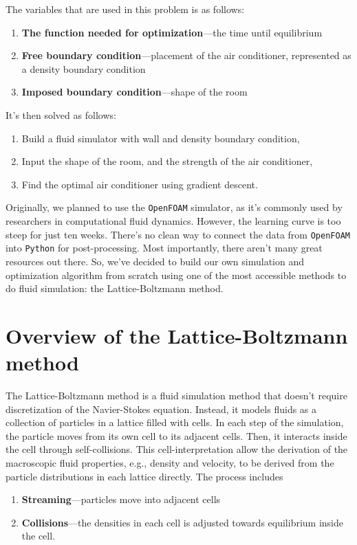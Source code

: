 The variables that are used in this problem is as follows:
\begin{enumerate}[noitemsep]
	\item \textbf{The function needed for optimization}---the time until equilibrium
	\item \textbf{Free boundary condition}---placement of the air conditioner, represented as a density boundary condition
	\item \textbf{Imposed boundary condition}---shape of the room
\end{enumerate}
It's then solved as follows:
\begin{enumerate}[noitemsep]
	\item Build a fluid simulator with wall and density boundary condition,
	\item Input the shape of the room, and the strength of the air conditioner,
	\item Find the optimal air conditioner using gradient descent.
\end{enumerate}

Originally, we planned to use the \texttt{OpenFOAM} simulator, as it's commonly used by researchers in computational fluid dynamics. However, the learning curve is too steep for just ten weeks. There's no clean way to connect the data from \texttt{OpenFOAM} into \texttt{Python} for post-processing. Most importantly, there aren't many great resources out there. So, we've decided to build our own simulation and optimization algorithm from scratch using one of the most accessible methods to do fluid simulation: the Lattice-Boltzmann method.

\section{Overview of the Lattice-Boltzmann method}

The Lattice-Boltzmann method is a fluid simulation method that doesn't require discretization of the Navier-Stokes equation. Instead, it models fluids as a collection of particles in a lattice filled with cells. In each step of the simulation, the particle moves from its own cell to its adjacent cells. Then, it interacts inside the cell through self-collisions. This cell-interpretation allow the derivation of the macroscopic fluid properties, e.g., density and velocity, to be derived from the particle distributions in each lattice directly. The process includes
\begin{enumerate}
	\item \textbf{Streaming}---particles move into adjacent cells
	\item \textbf{Collisions}---the densities in each cell is adjusted towards equilibrium inside the cell.
\end{enumerate}

